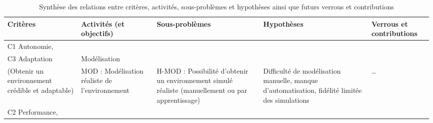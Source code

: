 \begin{table}[H]
  \centering
  \caption{Synthèse des relations entre critères, activités, sous-problèmes et hypothèses ainsi que futurs verrous et contributions}
  \label{tab:processus-methode}
  \renewcommand{\arraystretch}{1.2}
  \scriptsize
  \begin{tabularx}{\textwidth}{
      >{\raggedright\arraybackslash\hsize=0.20\hsize}X
      >{\raggedright\arraybackslash\hsize=0.20\hsize}X
      >{\raggedright\arraybackslash\hsize=0.25\hsize}X
      >{\raggedright\arraybackslash\hsize=0.26\hsize}X
      >{\raggedright\arraybackslash\hsize=0.09\hsize}X
    }
    \toprule
    \textbf{Critères}                                                                                                     & \textbf{Activités (et objectifs)} & \textbf{Sous-problèmes} & \textbf{Hypothèses} & \textbf{Verrous et contributions} \\
    \midrule
    C1 Autonomie,                                                                                                                                                                                                                                 \\
    C3 Adaptation
                                                                                                                          &
    Modélisation                                                                                                                                                                                                                                  \\
    (Obtenir un environnement crédible et adaptable)
                                                                                                                          &
    MOD : Modélisation réaliste de l'environnement
                                                                                                                          &
    \vspace{-1.05cm}H-MOD : Possibilité d'obtenir un environnement simulé réaliste (manuellement ou par apprentissage)
                                                                                                                          &
    \vspace{-1.05cm}Difficulté de modélisation manuelle, manque d'automatisation, fidélité limitée des simulations        & \dots
    \\
    \addlinespace[2pt]
    \hdashline
    \addlinespace[2pt]
    C2 Performance,                                                                                                                                                                                                                               \\

\end{tabularx}
\end{table}
